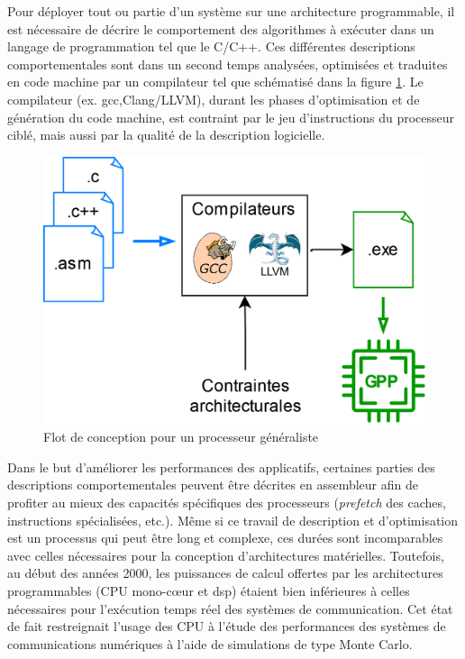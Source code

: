 \documentclass[../main.tex]{subfiles}
\begin{document}
Pour déployer tout ou partie d’un système sur une architecture programmable, il est nécessaire de décrire le comportement des algorithmes à exécuter dans un langage de programmation tel que le C/C++. Ces différentes descriptions comportementales sont dans un second temps analysées, optimisées et traduites en code machine par un compilateur tel que schématisé dans la figure \ref{methodo_GPP}. Le compilateur (ex. \acrshort{gcc},Clang/LLVM), durant les phases d’optimisation et de génération du code machine, est contraint par le jeu d’instructions du processeur ciblé, mais aussi par la qualité de la description logicielle.
\begin{figure}[tb]
    \centering
    \includegraphics[scale=0.20]{figs/methodo_gpp.png}
    \caption{Flot de conception pour un processeur généraliste}
    \label{methodo_GPP}
\end{figure}
Dans le but d’améliorer les performances des applicatifs, certaines parties des descriptions comportementales peuvent être décrites en assembleur afin de profiter au mieux des capacités spécifiques des processeurs (\textit{prefetch} des caches, instructions spécialisées, etc.). Même si ce travail de description et d’optimisation est un processus qui peut être long et complexe, ces durées sont incomparables avec celles nécessaires pour la conception d’architectures matérielles.
Toutefois, au début des années 2000, les puissances de calcul offertes par les architectures programmables (CPU mono-cœur et \acrshort{dsp}) étaient bien inférieures à celles nécessaires pour l’exécution temps réel des systèmes de communication. Cet état de fait restreignait l'usage des CPU à l’étude des performances des systèmes de communications numériques à l’aide de simulations de type Monte Carlo.
\end{document}
